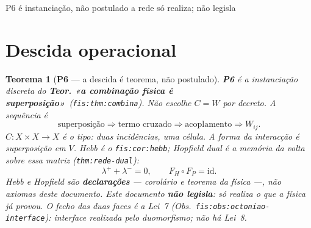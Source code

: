 \documentclass[11pt,a4paper]{article}
\newcommand{\code}[1]{\texttt{\small #1}}
\newcommand{\fis}[2]{\textbf{#2}~\textnormal{(\code{#1})}}
\providecommand{\pt}[1]{\textbf{P#1}}
\providecommand{\interfacen}[1]{}
\newtheorem{teorema}{Teorema}
\begin{document}
\interfacen{6}
       {P6 é instanciação, não postulado}
       {a rede só realiza; não legisla}
\maketitle

\begin{abstract}\noindent
Hebb/Hopfield na rede \textbf{não} são a fonte da lei, nem um postulado.
São declarações: $W_{ij}$ é o Cor.~\code{fis:cor:hebb}; a descida energética
é o Teor.~\code{fis:thm:desce}. A lei da combinação é o
Teor.~\code{fis:thm:combina}. A descida é
\[
\boxed{\text{álgebra}\to\text{norma}\to\text{combinação}\to C
\to\text{interferência}\to\text{Hebb/Hopfield}.}
\]
$C\colon X\times X\to X$ é o tipo (duas incidências, uma célula). A forma é
superposição em $V$. O fecho das duas faces é a Lei~7 --- interface realizada
pelo duomorfismo (\code{fis:obs:octoniao-interface}); \emph{não} há Lei~8 nem
postulado neste documento. A autoridade não vem de $\operatorname{lexMax}$,
$D_{\mathrm{can}}$, $\tau$ nem do pipe.
\end{abstract}

\section{Descida operacional}\label{redes:regra}

\begin{teorema}[\pt{6} --- a descida é teorema, não postulado]\label{redes:post:p6}\label{redes:post:hebb}\label{redes:post:niveis}\label{redes:post:overwrite}\label{redes:thm:p6}
\pt{6} é a instanciação discreta do \fis{fis:thm:combina}{Teor. «a combinação
física é superposição»}. Não escolhe $C=W$ por decreto. A sequência é
\[
\boxed{\text{superposição}\Rightarrow\text{termo cruzado}\Rightarrow
\text{acoplamento}\Rightarrow W_{ij}.}
\]
$C\colon X\times X\to X$ é o tipo: duas incidências, uma célula. A forma da
interacção é superposição em $V$. Hebb é o \code{fis:cor:hebb}; Hopfield dual
é a memória da volta sobre essa matriz (\code{thm:rede-dual}):
\[
\lambda^{+}+\lambda^{-}=0,\qquad F_H\circ F_P=\mathrm{id}.
\]
Hebb e Hopfield são \textbf{declarações} --- corolário e teorema da física ---,
não axiomas deste documento. Este documento \textbf{não legisla}: só realiza
o que a física já provou. O fecho das duas faces é a Lei~7 (Obs.~\code{fis:obs:octoniao-interface}):
interface realizada pelo duomorfismo; \emph{não} há Lei~8.
\end{teorema}
\end{document}
